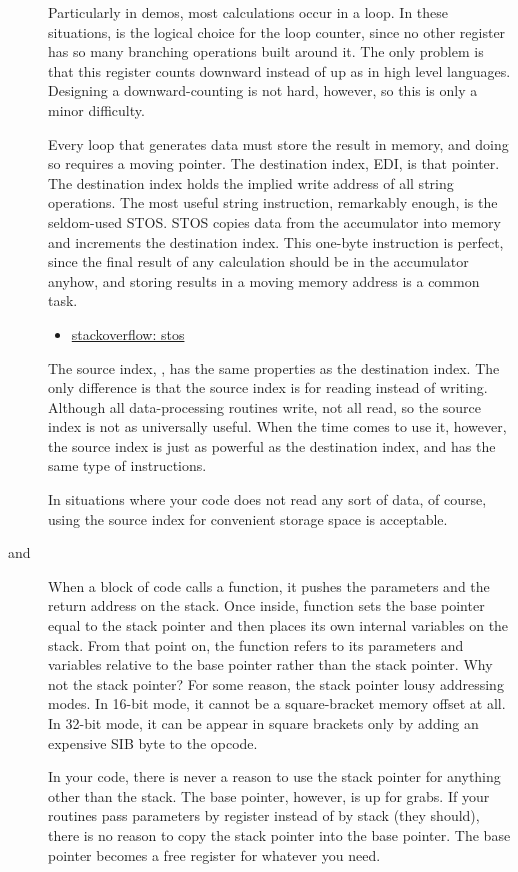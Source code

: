 \begin{description}
  Particularly in demos, most calculations occur in a loop. In these situations,
   is the logical choice for the loop counter, since no other register has so
  many branching operations built around it. The only problem is that this register counts
  downward instead of up as in high level languages. Designing a downward-counting is not
  hard, however, so this is only a minor difficulty.
\item[\code{EDI}] Every loop that generates data must store the result in memory, and
  doing so requires a moving pointer. The destination index, EDI, is that pointer. The
  destination index holds the implied write address of all string operations. The most
  useful string instruction, remarkably enough, is the seldom-used STOS. STOS copies data
  from the accumulator into memory and increments the destination index. This one-byte
  instruction is perfect, since the final result of any calculation should be in the
  accumulator anyhow, and storing results in a moving memory address is a common task.
  \begin{itemize}
  \item
    \href{http://stackoverflow.com/questions/3818856/what-does-this-assembly-do}{stackoverflow:
      stos}
  \end{itemize}
\item[\code{ESI}] The source index, , has the same properties as the destination
  index. The only difference is that the source index is for reading instead of
  writing. Although all data-processing routines write, not all read, so the source index
  is not as universally useful. When the time comes to use it, however, the source index
  is just as powerful as the destination index, and has the same type of instructions.

  In situations where your code does not read any sort of data, of course, using the
  source index for convenient storage space is acceptable.
\item[\code{ESP} and \code{EBP}] When a block of code calls a function, it pushes the
  parameters and the return address on the stack. Once inside, function sets the base
  pointer equal to the stack pointer and then places its own internal variables on the
  stack. From that point on, the function refers to its parameters and variables relative
  to the base pointer rather than the stack pointer. Why not the stack pointer?  For some
  reason, the stack pointer lousy addressing modes. In 16-bit mode, it cannot be a
  square-bracket memory offset at all. In 32-bit mode, it can be appear in square brackets
  only by adding an expensive SIB byte to the opcode.

  In your code, there is never a reason to use the stack pointer for anything other than
  the stack. The base pointer, however, is up for grabs. If your routines pass parameters
  by register instead of by stack (they should), there is no reason to copy the stack
  pointer into the base pointer. The base pointer becomes a free register for whatever you
  need.
\end{description}

